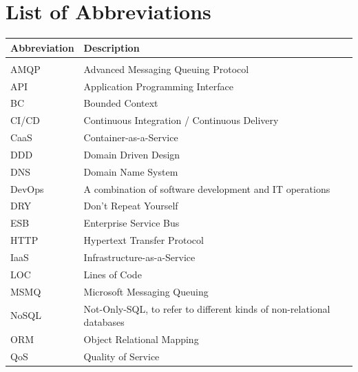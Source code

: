 \documentclass{Configuration_Files/PoliMi3i_thesis}
\begin{document}



\listoffigures

\listoftables

\chapter*{List of Abbreviations}
\begin{table}[H]
    \centering
    \begin{tabular}{ll}
        \textbf{Abbreviation} & \textbf{Description} \\\hline\\[-9px]
        AMQP & Advanced Messaging Queuing Protocol \\[2px]
        API & Application Programming Interface \\[2px]
        BC & Bounded Context \\[2px]
        CI/CD & Continuous Integration / Continuous Delivery \\[2px]
        CaaS & Container-as-a-Service \\[2px]
        DDD & Domain Driven Design \\[2px]
        DNS & Domain Name System \\[2px]
        DevOps & A combination of software development and IT operations \\[2px]
        DRY & Don't Repeat Yourself \\[2px]
        ESB & Enterprise Service Bus \\[2px]
        HTTP & Hypertext Transfer Protocol \\[2px]
        IaaS & Infrastructure-as-a-Service \\[2px]
        LOC & Lines of Code \\[2px]
        MSMQ & Microsoft Messaging Queuing \\[2px]
        NoSQL & Not-Only-SQL, to refer to different kinds of non-relational databases \\[2px]
        ORM & Object Relational Mapping \\[2px]
        QoS & Quality of Service \\[2px]

\end{tabular}
\end{table}
\end{document}
